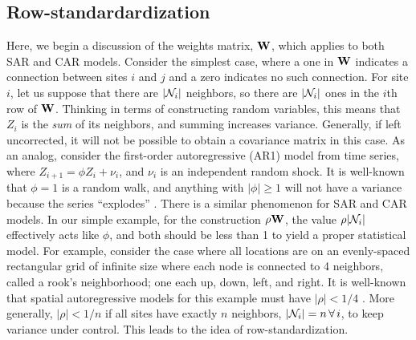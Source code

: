 \documentclass[11pt, titlepage]{article}\usepackage[]{graphicx}\usepackage[]{color}
\begin{document}

\subsection*{Row-standardardization}

Here, we begin a discussion of the weights matrix, $\mathbf{W}$, which applies to both SAR and CAR models.  Consider the simplest case, where a one in $\mathbf{W}$ indicates a connection between sites $i$ and $j$ and a zero indicates no such connection.  For site $i$, let us suppose that there are $|\mathcal{N}_i|$ neighbors, so there are $|\mathcal{N}_i|$ ones in the $i$th row of $\mathbf{W}$.  Thinking in terms of constructing random variables, this means that $Z_i$ is the \textit{sum} of its neighbors, and summing increases variance.  Generally, if left uncorrected, it will not be possible to obtain a covariance matrix in this case. As an analog, consider the first-order autoregressive (AR1) model from time series, where $Z_{i+1} = \phi Z_i + \nu_i$, and $\nu_i$ is an independent random shock.  It is well-known that $\phi = 1$ is a random walk, and anything with $|\phi| \geq 1$ will not have a variance because the series ``explodes'' \citep[e.g.,][pg. 53]{Hami:time:1994}.  There is a similar phenomenon for SAR and CAR models. In our simple example, for the construction $\rho\mathbf{W}$, the value  $\rho |\mathcal{N}_i|$ effectively acts like $\phi$, and both should be less than 1 to yield a proper statistical model. For example, consider the case where all locations are on an evenly-spaced rectangular grid of infinite size where each node is connected to 4 neighbors, called a rook's neighborhood; one each up, down, left, and right. It is well-known that spatial autoregressive models for this example must have $|\rho| < 1/4$ \citep[pg. 82]{Hain:spat:1990}. More generally, $|\rho| < 1/n$ if all sites have exactly $n$ neighbors, $|\mathcal{N}_i| = n \, \forall \, i$, to keep variance under control. This leads to the idea of row-standardization.  
\end{document}
